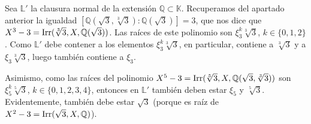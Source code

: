 \documentclass[11pt]{report}
\makeatletter
\renewenvironment{proof}[1][\proofname]{\par
  \pushQED{\qed}%
  \normalfont \topsep\z@skip %
  \trivlist
  \item[\hskip\labelsep
        \itshape
    #1\@addpunct{.}]\ignorespaces
}{%
  \popQED\endtrivlist\@endpefalse
}
\newcommand{\Q}{\mathbb Q}
\newcommand{\K}{\mathbb K}
\renewcommand{\L}{\mathbb L}
\makeatother
\begin{document}
\begin{proof}
\begin{enumerate}
    Sea $\L'$ la clausura normal de la extensión $\Q \subset \K$. Recuperamos del apartado anterior la igualdad $[\Q(\sqrt{3}, \sqrt[3]{3}) \colon \Q(\sqrt{3})] = 3$, que nos dice que $X^3-3 = \textup{Irr}(\sqrt[3]{3},X,\Q(\sqrt{3}))$. Las raíces de este polinomio son $\xi_3^k\sqrt[3]{3}$, $k \in \{0,1,2\}$. Como $\L'$ debe contener a los elementos $\xi_3^k\sqrt[3]{3}$, en particular, contiene a $\sqrt[3]{3}$ y a $\xi_3\sqrt[3]{3}$, luego también contiene a $\xi_3$.
    
    Asimismo, como las raíces del polinomio $ X^5-3 = \textup{Irr}(\sqrt[5]{3}, X,\Q(\sqrt{3}, \sqrt[3]{3}))$ son $\xi_5^k\sqrt[5]{3}$, $k \in \{0,1,2,3,4\}$, entonces en $\L'$ también deben estar $\xi_5$ y $\sqrt[5]{3}$. Evidentemente, también debe estar $\sqrt{3}$ (porque es raíz de $X^2-3 = \textup{Irr}(\sqrt{3},X,\Q)$).


\end{enumerate}
\end{proof}
\end{document}
